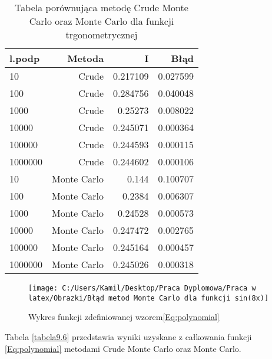 \documentclass[12pt,twoside]{article}
\begin{document}
\begin{table}
\centering 
\caption{Tabela porównująca metodę Crude Monte Carlo oraz Monte Carlo dla funkcji trgonometrycznej}
\label{tabela9.6}
\begin{tabular}{lrrr}
\toprule
{l.podp} & Metoda &  I &  Błąd \\
\midrule
10  &     Crude & 0.217109  &   0.027599 \\
100  &     Crude & 0.284756 &   0.040048 \\
1000  &    Crude & 0.25273   &   0.008022  \\
10000  &    Crude & 0.245071  &   0.000364  \\
100000  &    Crude & 0.244593 &    0.000115   \\
1000000  &    Crude & 0.244602 &    0.000106   \\

10  &     Monte Carlo & 0.144  &   0.100707 \\
100  &     Monte Carlo & 0.2384  &   0.006307 \\
1000  &    Monte Carlo & 0.24528   &   0.000573  \\
10000  &    Monte Carlo & 0.247472  &   0.002765  \\
100000  &    Monte Carlo & 0.245164 &    0.000457   \\
1000000  &    Monte Carlo & 0.245026 &    0.000318   \\
\bottomrule
\end{tabular}
\end{table}

\begin{figure}
\texttt{[image: C:/Users/Kamil/Desktop/Praca Dyplomowa/Praca w latex/Obrazki/Błąd metod Monte Carlo dla funkcji sin(8x)]}
\caption{Wykres funkcji zdefiniowanej wzorem\eqref{Eq:polynomial}}
\end{figure}


Tabela \eqref{tabela9.6} przedstawia wyniki uzyskane z całkowania funkcji \eqref{Eq:polynomial} metodami Crude Monte Carlo oraz Monte Carlo.
\end{document}
